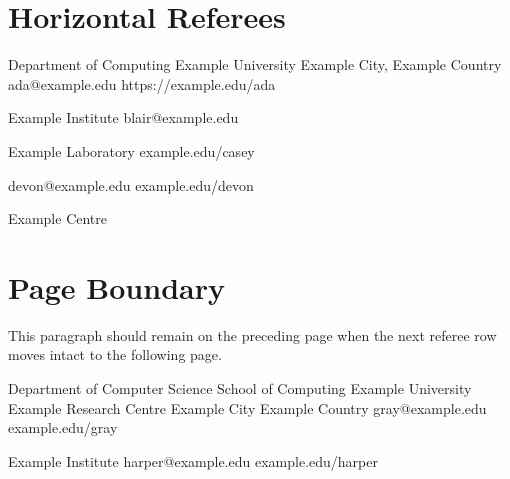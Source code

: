 \documentclass[english,letterpaper,11pt]{article}
\begin{document}
\section{Horizontal Referees}

{\newline
  Department of Computing\newline
  Example University\newline
  Example City, Example Country}
{ada@example.edu}
{https://example.edu/ada}

{\newline Example Institute}
{blair@example.edu}
{}

{\newline Example Laboratory}
{}
{example.edu/casey}

{}
{devon@example.edu}
{example.edu/devon}

{\newline Example Centre}
{}
{}


\newpage
\section{Page Boundary}

This paragraph should remain on the preceding page when the next referee row moves intact to the following page.
\par

\vspace*{0.8\textheight}
\pagebreak[0]

{\newline
  Department of Computer Science\newline
  School of Computing\newline
  Example University\newline
  Example Research Centre\newline
  Example City\newline
  Example Country}
{gray@example.edu}
{example.edu/gray}

{\newline Example Institute}
{harper@example.edu}
{example.edu/harper}
\end{document}
